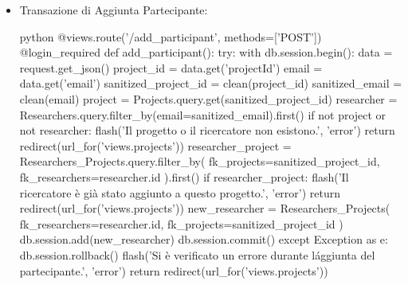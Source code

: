 \documentclass{report}
\begin{document}
\begin{itemize}
\item Transazione di Aggiunta Partecipante:\\
\begin{minipage}{\linewidth}
\begin{imtaCode}{python}
@views.route('/add_participant', methods=['POST'])
@login_required
def add_participant():
    try:
        with db.session.begin():
            data = request.get_json()
            project_id = data.get('projectId')
            email = data.get('email')
            sanitized_project_id = clean(project_id)
            sanitized_email = clean(email)
            project = Projects.query.get(sanitized_project_id)
            researcher = Researchers.query.filter_by(email=sanitized_email).first()
            if not project or not researcher:
                flash('Il progetto o il ricercatore non esistono.', 'error')
                return redirect(url_for('views.projects'))
            researcher_project = Researchers_Projects.query.filter_by(
                fk_projects=sanitized_project_id,
                fk_researchers=researcher.id
            ).first()
            if researcher_project:
                flash('Il ricercatore è già stato aggiunto a questo progetto.', 'error')
                return redirect(url_for('views.projects'))
            new_researcher = Researchers_Projects(
                fk_researchers=researcher.id,
                fk_projects=sanitized_project_id
            )
            db.session.add(new_researcher)
        db.session.commit()
    except Exception as e:
        db.session.rollback()
        flash('Si è verificato un errore durante l\'aggiunta del partecipante.', 'error')
    return redirect(url_for('views.projects'))
         \end{imtaCode}
\end{minipage}
\end{itemize}
\end{document}

